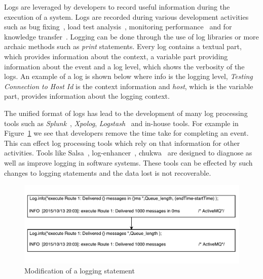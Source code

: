 Logs are leveraged by developers to record useful information during the execution of a system. Logs are recorded during various development activities such as bug fixing~\cite{ConsoleLogs,JGLouMining,QFuanomaly}, load test analysis~\cite{Automatic}, monitoring performance~\cite{Yuan} and for knowledge transfer~\cite{IanWCRE}.
Logging can be done through the use of log libraries or more archaic methods such as \textsl{print} statements. Every log contains a textual part, which provides information about the context, a variable part providing information about the event and a log level, which shows the verbosity of the logs. An example of a log is shown below where info is the logging level, \textsl{Testing Connection to Host Id} is the context information and \textsl{host}, which is the variable part, provides information about the logging context.

The unified format of logs has lead to the development of many log processing tools such as \textsl{Splunk}~\cite{carasso2012exploring}, \textsl{Xpolog}, \textsl{Logstash}~\cite{xu2013detecting} and in-house tools. For example in Figure~\ref{fig:ExampleOfLogChange_LPA} we see that developers remove the time take for completing an event. This can effect log processing tools which rely on that information for other activities. Tools like Salsa~\cite{TanSalsa}, log-enhancer~\cite{Yuan}, chukwa~\cite{chukwa} 	are designed to diagnose as well as improve logging in software systems. These tools can be effected by such changes to logging statements and the data lost is not recoverable.



\begin{figure}[tb]
\centering
\includegraphics[width=1\columnwidth]{ExampleOfLogChange_LPA}
\caption{Modification of a logging statement}
\label{fig:ExampleOfLogChange_LPA}
\end{figure}



